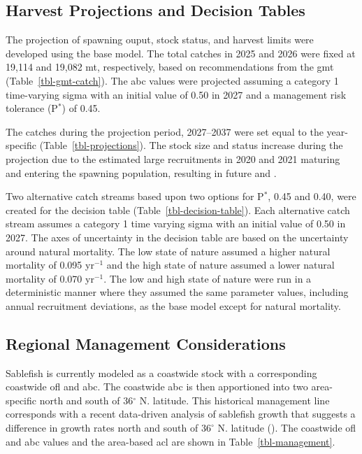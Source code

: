 \documentclass[
  english,
]{article}
\begin{document}
\subsection{Harvest Projections and Decision Tables}\label{forecast}

The projection of spawning ouput, stock status, and harvest limits were
developed using the base model. The total catches in 2025 and 2026 were
fixed at 19,114 and 19,082 mt, respectively, based on recommendations
from the \gls{gmt} (Table~\ref{tbl-gmt-catch}). The \gls{abc} values
were projected assuming a category 1 time-varying sigma with an initial
value of 0.50 in 2027 and a management risk tolerance (P\(^*\)) of 0.45.

The catches during the projection period, 2027--2037 were set equal to
the year-specific  (Table~\ref{tbl-projections}). The
stock size and status increase during the projection due to the
estimated large recruitments in 2020 and 2021 maturing and entering the
spawning population, resulting in future  and
.

Two alternative catch streams based upon two options for P\(^*\), 0.45
and 0.40, were created for the decision table
(Table~\ref{tbl-decision-table}). Each alternative catch stream assumes
a category 1 time varying sigma with an initial value of 0.50 in 2027.
The axes of uncertainty in the decision table are based on the
uncertainty around natural mortality. The low state of nature assumed a
higher natural mortality of 0.095 yr\(^{-1}\) and the high state of
nature assumed a lower natural mortality of 0.070 yr\(^{-1}\). The low
and high state of nature were run in a deterministic manner where they
assumed the same parameter values, including annual recruitment
deviations, as the base model except for natural mortality.

\subsection{Regional Management
Considerations}\label{regional-management-considerations}

Sablefish is currently modeled as a coastwide stock with a corresponding
coastwide \gls{ofl} and \gls{abc}. The coastwide \gls{abc} is then
apportioned into two area-specific  north and south of
36\(^\circ\) N. latitude. This historical management line corresponds
with a recent data-driven analysis of sablefish growth that suggests a
difference in growth rates north and south of \(36^\circ\) N. latitude
(). The
coastwide \gls{ofl} and \gls{abc} values and the area-based \gls{acl}
are shown in Table~\ref{tbl-management}.
\end{document}
